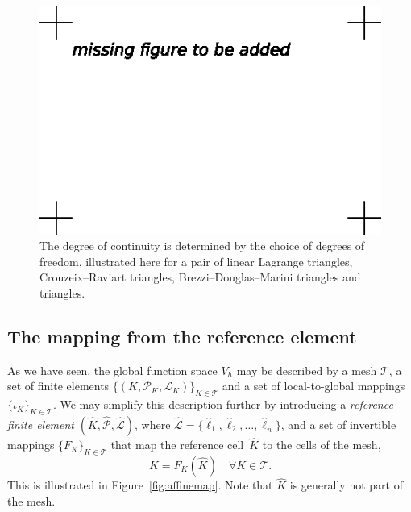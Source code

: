 \begin{figure}
  \begin{center}
    \includegraphics[width=\largewidth]{chapters/kirby-7/eps/missing-figure.eps}
    \caption{The degree of continuity is determined by the choice of
      degrees of freedom, illustrated here for a pair of linear
      Lagrange triangles, Crouzeix--Raviart triangles,
      Brezzi--Douglas--Marini triangles and \nedelec{} triangles.}
    \label{fig:continuity}
  \end{center}
\end{figure}

\subsection{The mapping from the reference element}


As we have seen, the global function space $V_h$ may be described by a
mesh $\mathcal{T}$, a set of finite elements
$\{(K,\mathcal{P}_K,\mathcal{L}_K)\}_{K\in\mathcal{T}}$ and a set of
local-to-global mappings $\{\iota_K\}_{K\in\mathcal{T}}$. We may
simplify this description further by introducing a \emph{reference
finite element} $(\hat{K},\hat{\mathcal{P}},\hat{\mathcal{L}})$, where
$\hat{\mathcal{L}} =
\{\hat{\ell}_1,\hat{\ell}_2,\ldots,\hat{\ell}_{\hat{n}}\}$, and a set
of invertible mappings $\{F_K\}_{K\in\mathcal{T}}$ that map the
reference cell~$\hat{K}$ to the cells of the mesh,
\begin{equation}
  K = F_K(\hat{K}) \quad \forall K \in \mathcal{T}.
\end{equation}
This is illustrated in Figure~\ref{fig:affinemap}. Note that $\hat{K}$
is generally not part of the mesh.

